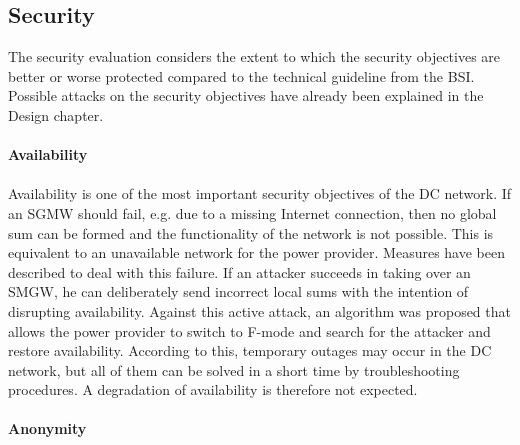 \subsection{Security}
The security evaluation considers the extent to which the security objectives are better or worse protected compared to the technical guideline from the BSI. Possible attacks on the security objectives have already been explained in the Design chapter.
\\
\\
\textbf{Availability}
\\
\\
Availability is one of the most important security objectives of the DC network. If an SGMW should fail, e.g. due to a missing Internet connection, then no global sum can be formed and the functionality of the network is not possible. This is equivalent to an unavailable network for the power provider. Measures have been described to deal with this failure. If an attacker succeeds in taking over an SMGW, he can deliberately send incorrect local sums with the intention of disrupting availability. Against this active attack, an algorithm was proposed that allows the power provider to switch to F-mode and search for the attacker and restore availability. According to this, temporary outages may occur in the DC network, but all of them can be solved in a short time by troubleshooting procedures. A degradation of availability is therefore not expected.
\\
\\
\textbf{Anonymity}
\\
\\
